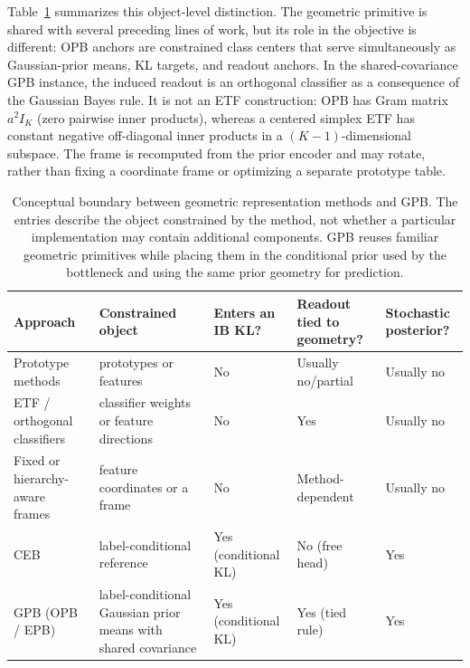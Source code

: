 Table~\ref{tab:geometry-boundary} summarizes this object-level distinction. The
geometric primitive is shared with several preceding lines of work, but its role in
the objective is different: OPB anchors are constrained class centers that serve
simultaneously as Gaussian-prior means, KL targets, and readout anchors. In the
shared-covariance GPB instance, the induced readout is an orthogonal classifier
as a consequence of the Gaussian Bayes rule. It is not an ETF construction: OPB has
Gram matrix $a^2 I_K$ (zero pairwise inner products), whereas a centered simplex ETF
has constant negative off-diagonal inner products in a $(K-1)$-dimensional subspace.
The frame is recomputed from the prior encoder and may rotate, rather than fixing a
coordinate frame or optimizing a separate prototype table.

\begin{table}[t]
\centering
\small
\setlength{\tabcolsep}{3pt}
\renewcommand{\arraystretch}{1.12}
\caption{Conceptual boundary between geometric representation methods and GPB. The
entries describe the object constrained by the method, not whether a particular
implementation may contain additional components. GPB reuses familiar geometric
primitives while placing them in the conditional prior used by the bottleneck and
using the same prior geometry for prediction.}
\label{tab:geometry-boundary}
\begin{tabular}{p{2.35cm} p{2.65cm} p{2.0cm} p{2.35cm} p{1.95cm}}
\hline
Approach & Constrained object & Enters an IB KL? & Readout tied to geometry? & Stochastic posterior? \\
\hline
Prototype methods~\citep{deng2014equidistant} & prototypes or features & No & Usually no/partial & Usually no \\
ETF / orthogonal classifiers~\citep{xu2022orthogonal,ji2023etf} & classifier weights or feature directions & No & Yes & Usually no \\
Fixed or hierarchy-aware frames~\citep{tong2023fixed_frame} & feature coordinates or a frame & No & Method-dependent & Usually no \\
CEB~\citep{fischer2020conditional} & label-conditional reference & Yes (conditional KL) & No (free head) & Yes \\
GPB (OPB / EPB) & label-conditional Gaussian prior means with shared covariance & Yes (conditional KL) & Yes (tied rule) & Yes \\
\hline
\end{tabular}
\end{table}

